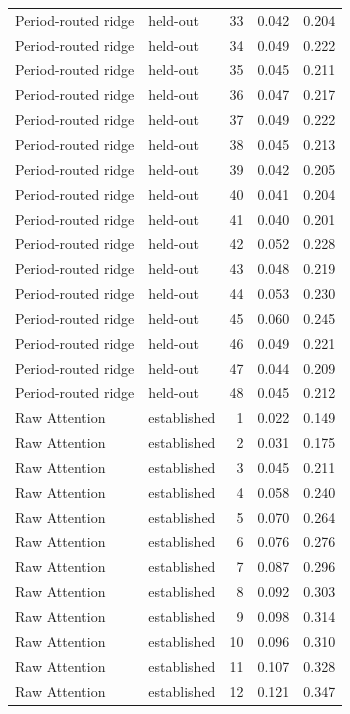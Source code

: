 \begin{tabular}{llrrr}
Period-routed ridge & held-out & 33 & 0.042 & 0.204 \\
Period-routed ridge & held-out & 34 & 0.049 & 0.222 \\
Period-routed ridge & held-out & 35 & 0.045 & 0.211 \\
Period-routed ridge & held-out & 36 & 0.047 & 0.217 \\
Period-routed ridge & held-out & 37 & 0.049 & 0.222 \\
Period-routed ridge & held-out & 38 & 0.045 & 0.213 \\
Period-routed ridge & held-out & 39 & 0.042 & 0.205 \\
Period-routed ridge & held-out & 40 & 0.041 & 0.204 \\
Period-routed ridge & held-out & 41 & 0.040 & 0.201 \\
Period-routed ridge & held-out & 42 & 0.052 & 0.228 \\
Period-routed ridge & held-out & 43 & 0.048 & 0.219 \\
Period-routed ridge & held-out & 44 & 0.053 & 0.230 \\
Period-routed ridge & held-out & 45 & 0.060 & 0.245 \\
Period-routed ridge & held-out & 46 & 0.049 & 0.221 \\
Period-routed ridge & held-out & 47 & 0.044 & 0.209 \\
Period-routed ridge & held-out & 48 & 0.045 & 0.212 \\
Raw Attention & established & 1 & 0.022 & 0.149 \\
Raw Attention & established & 2 & 0.031 & 0.175 \\
Raw Attention & established & 3 & 0.045 & 0.211 \\
Raw Attention & established & 4 & 0.058 & 0.240 \\
Raw Attention & established & 5 & 0.070 & 0.264 \\
Raw Attention & established & 6 & 0.076 & 0.276 \\
Raw Attention & established & 7 & 0.087 & 0.296 \\
Raw Attention & established & 8 & 0.092 & 0.303 \\
Raw Attention & established & 9 & 0.098 & 0.314 \\
Raw Attention & established & 10 & 0.096 & 0.310 \\
Raw Attention & established & 11 & 0.107 & 0.328 \\
Raw Attention & established & 12 & 0.121 & 0.347 \\

\end{tabular}
